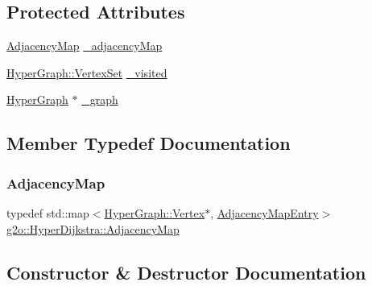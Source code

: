 \subsection*{Protected Attributes}
\begin{DoxyCompactItemize}
\item 
\mbox{\hyperlink{structg2o_1_1_hyper_dijkstra_af12ff8eef95094815a3fa1da0514bda2}{Adjacency\+Map}} \mbox{\hyperlink{structg2o_1_1_hyper_dijkstra_ae306dd26e901b88fe6c54f02a45c3e7f}{\+\_\+adjacency\+Map}}
\item 
\mbox{\hyperlink{classg2o_1_1_hyper_graph_a703938cdb4bb636860eed55a2489d70c}{Hyper\+Graph\+::\+Vertex\+Set}} \mbox{\hyperlink{structg2o_1_1_hyper_dijkstra_ad43cae6d9e1df2cf7db839f504ba6cc5}{\+\_\+visited}}
\item 
\mbox{\hyperlink{classg2o_1_1_hyper_graph}{Hyper\+Graph}} $\ast$ \mbox{\hyperlink{structg2o_1_1_hyper_dijkstra_a1bf21d65ddd6e0feeb6a76f58d7f2c6e}{\+\_\+graph}}
\end{DoxyCompactItemize}


\subsection{Member Typedef Documentation}
\mbox{\label{structg2o_1_1_hyper_dijkstra_af12ff8eef95094815a3fa1da0514bda2}} 
\subsubsection{\texorpdfstring{Adjacency\+Map}{AdjacencyMap}}
{\footnotesize\ttfamily typedef std\+::map$<$\mbox{\hyperlink{classg2o_1_1_hyper_graph_1_1_vertex}{Hyper\+Graph\+::\+Vertex}}$\ast$, \mbox{\hyperlink{structg2o_1_1_hyper_dijkstra_1_1_adjacency_map_entry}{Adjacency\+Map\+Entry}}$>$ \mbox{\hyperlink{structg2o_1_1_hyper_dijkstra_af12ff8eef95094815a3fa1da0514bda2}{g2o\+::\+Hyper\+Dijkstra\+::\+Adjacency\+Map}}}



\subsection{Constructor \& Destructor Documentation}
\mbox{\label{structg2o_1_1_hyper_dijkstra_a55e844f4b596290cb36a0d9fe4140966}} 
